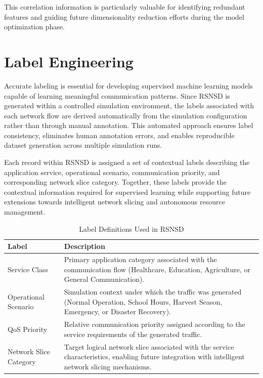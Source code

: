 \documentclass[12pt,a4paper]{report}
\begin{document}
	This correlation information is particularly valuable for identifying redundant features and guiding future dimensionality reduction efforts during the model optimization phase.

\section{Label Engineering}
\label{sec:label_engineering}

Accurate labeling is essential for developing supervised machine learning models capable of learning meaningful communication patterns. Since RSNSD is generated within a controlled simulation environment, the labels associated with each network flow are derived automatically from the simulation configuration rather than through manual annotation. This automated approach ensures label consistency, eliminates human annotation errors, and enables reproducible dataset generation across multiple simulation runs.

Each record within RSNSD is assigned a set of contextual labels describing the application service, operational scenario, communication priority, and corresponding network slice category. Together, these labels provide the contextual information required for supervised learning while supporting future extensions towards intelligent network slicing and autonomous resource management.



\begin{table}[H]
	\centering
	\caption{Label Definitions Used in RSNSD}
	\label{tab:labels}
	
	\begin{tabular}{|p{5cm}|p{9cm}|}
		\hline
		
		\textbf{Label} &
		\textbf{Description}
		\\
		\hline
		
		Service Class &
		Primary application category associated with the communication flow (Healthcare, Education, Agriculture, or General Communication).
		\\
		\hline
		
		Operational Scenario &
		Simulation context under which the traffic was generated (Normal Operation, School Hours, Harvest Season, Emergency, or Disaster Recovery).
		\\
		\hline
		
		QoS Priority &
		Relative communication priority assigned according to the service requirements of the generated traffic.
		\\
		\hline
		
		Network Slice Category &
		Target logical network slice associated with the service characteristics, enabling future integration with intelligent network slicing mechanisms.
		\\
		\hline
		
	\end{tabular}
	
\end{table}
\end{document}
